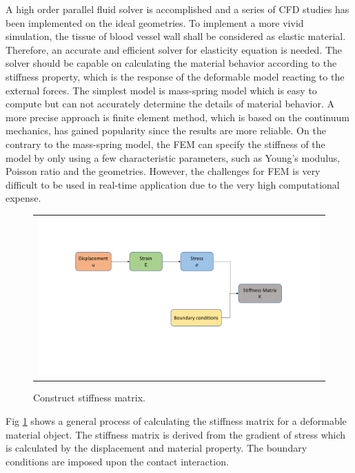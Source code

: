 A high order parallel fluid solver \cite{liang2007large, liang2007large, liang2009effect} is accomplished and a series of CFD studies has been implemented on the ideal geometries. To implement a more vivid simulation, the tissue of blood vessel wall shall be considered as elastic material. Therefore, an accurate and efficient solver for elasticity equation is needed. The solver should be capable on calculating the material behavior according to the stiffness property, which is the response of the deformable model reacting to the external forces. The simplest model is mass-spring model which is easy to compute but can not accurately determine the details of material behavior. A more precise approach is finite element method, which is based on the continuum mechanics, has gained popularity since the results are more reliable. On the contrary to the mass-spring model, the FEM can specify the stiffness of the model by only using a few characteristic parameters, such as Young's modulus, Poisson ratio and the geometries. However, the challenges for FEM is very difficult to be used in real-time application due to the very high computational expense. 

\begin{figure}[H]
	\centering
	\begin{tabular}{c}
		\includegraphics[width=1.2\textwidth]{./pics/construct_matrix}
	\end{tabular}
	\caption{\footnotesize Construct stiffness matrix.} \label{fig: ch1f2}
\end{figure}

Fig \ref{fig: ch1f2} shows a general process of calculating the stiffness matrix for a deformable material object. The stiffness matrix is derived from the gradient of stress which is calculated by the displacement and material property. The boundary conditions are imposed upon the contact interaction.

